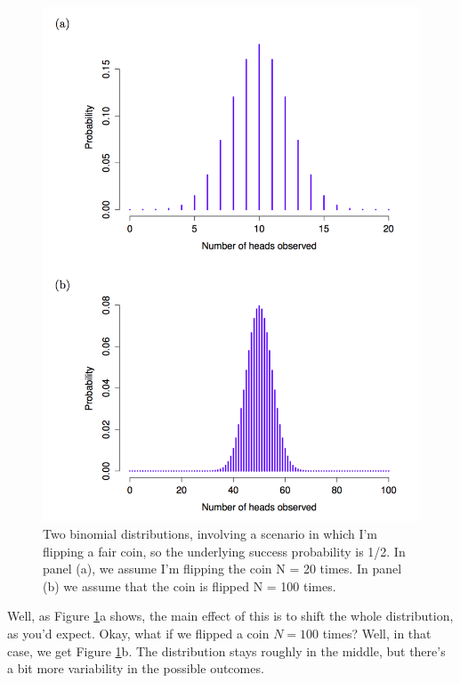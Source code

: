 \documentclass[
]{book}
\begin{document}
\begin{figure}
\centering
\includegraphics{navarro_img/probability/Binomial2.png}
\caption{\label{fig:4binomial2}Two binomial distributions, involving a scenario in which I'm flipping a fair coin, so the underlying success probability is 1/2. In panel (a), we assume I'm flipping the coin N = 20 times. In panel (b) we assume that the coin is flipped N = 100 times.}
\end{figure}

Well, as Figure \ref{fig:4binomial2}a shows, the main effect of this is to shift the whole distribution, as you'd expect. Okay, what if we flipped a coin \(N=100\) times? Well, in that case, we get Figure \ref{fig:4binomial2}b. The distribution stays roughly in the middle, but there's a bit more variability in the possible outcomes.
\end{document}
